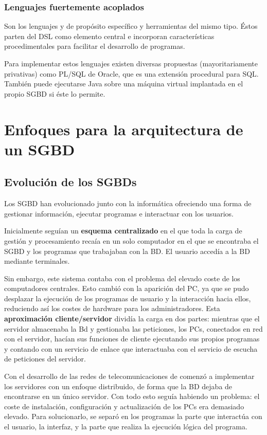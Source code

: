 \subsubsection{Lenguajes fuertemente acoplados}

Son los lenguajes y de propósito específico y herramientas del mismo tipo.
Éstos parten del DSL como elemento central e incorporan características procedimentales para facilitar el desarrollo de programas.

Para implementar estos lenguajes existen diversas propuestas (mayoritariamente privativas) como PL/SQL de Oracle, que es una extensión procedural para SQL\@.
También puede ejecutarse Java sobre una máquina virtual implantada en el propio SGBD si éste lo permite.

\section{Enfoques para la arquitectura de un SGBD}

\subsection{Evolución de los SGBDs}

Los SGBD han evolucionado junto con la informática ofreciendo una forma de gestionar información, ejecutar programas e interactuar con los usuarios.

Inicialmente seguían un \textbf{esquema centralizado} en el que toda la carga de gestión y procesamiento recaía en un solo computador en el que se encontraba el SGBD y los programas que trabajaban con la BD\@.
El usuario accedía a la BD mediante terminales.

Sin embargo, este sistema contaba con el problema del elevado coste de los computadores centrales.
Esto cambió con la aparición del PC, ya que se pudo desplazar la ejecución de los programas de usuario y la interacción hacia ellos, reduciendo así los costes de hardware para los administradores.
Esta \textbf{aproximación cliente/servidor} dividía la carga en dos partes: mientras que el servidor almacenaba la Bd y gestionaba las peticiones, los PCs, conectados en red con el servidor, hacían sus funciones de cliente ejecutando sus propios programas y contando con un servicio de enlace que interactuaba con el servicio de escucha de peticiones del servidor.

Con el desarrollo de las redes de telecomunicaciones de comenzó a implementar los servidores con un enfoque distribuido, de forma que la BD dejaba de encontrarse en un único servidor.
Con todo esto seguía habiendo un problema: el coste de instalación, configuración y actualización de los PCs era demasiado elevado.
Para solucionarlo, se separó en los programas la parte que interactúa con el usuario, la interfaz, y la parte que realiza la ejecución lógica del programa.

